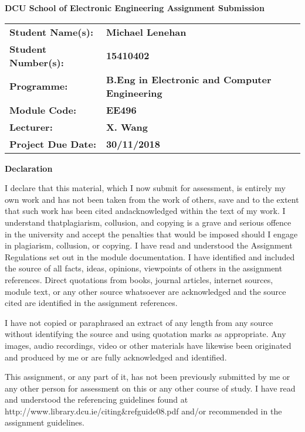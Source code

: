 \documentclass[12pt,a4paper]{scrartcl}
\begin{document}
\begin{titlepage}
  \begin{center}
    \vspace{1cm}
    {\Large\textbf{DCU School of Electronic Engineering Assignment Submission}}

    \vspace{0.5cm}
    \begin{tabu}{ X[l] X[2l] }
      \textbf{Student Name(s):} & \textbf{Michael Lenehan} \\
      \textbf{Student Number(s):} & \textbf{15410402} \\
      \textbf{Programme:} & \textbf{B.Eng in Electronic and Computer Engineering} \\
      \textbf{Module Code:} & \textbf{EE496} \\
      \textbf{Lecturer:} & \textbf{X. Wang} \\    
      \textbf{Project Due Date:} & \textbf{30/11/2018}
    \end{tabu}

    \vspace{0.5cm}
    \textbf{Declaration}
 \end{center}
    \begin{bfseries}
    I declare that this material, which I now submit for assessment, is entirely
    my own work and has not been taken from the work of others, save and to the
    extent that such work has been cited andacknowledged within the text of my
    work. I understand thatplagiarism, collusion, and copying is a grave and
    serious offence in the university and accept the penalties that would be
    imposed should I engage in plagiarism, collusion, or copying. I have read
    and understood the Assignment Regulations set out in the module documentation.
    I have identified and included the source of all facts, ideas, opinions,
    viewpoints of others in the assignment references. Direct quotations from
    books, journal articles, internet sources, module text, or any other source
    whatsoever are acknowledged and the source cited are identified in the
    assignment references. 
    
    I have not copied or paraphrased an extract of any
    length from any source without identifying the source and using quotation
    marks as appropriate. Any images, audio recordings, video or other materials
    have likewise been originated and produced by me or are fully acknowledged
    and identified.
    
    This assignment, or any part of it, has not been previously
    submitted by me or any other person for assessment on this or any other 
    course of study. I have read and understood the referencing guidelines found
    at http://www.library.dcu.ie/citing\&refguide08.pdf and/or recommended in the
    assignment guidelines. 
    

\end{bfseries}
\end{titlepage}
\end{document}
